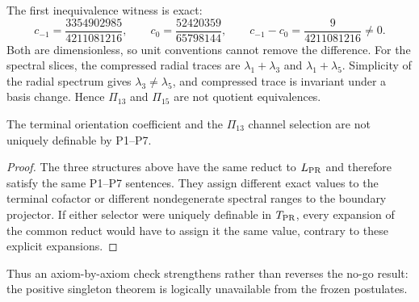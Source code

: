 The first inequivalence witness is exact:
\begin{equation}
 c_{-1}=\frac{3354902985}{4211081216},\qquad
 c_0=\frac{52420359}{65798144},\qquad
 c_{-1}-c_0=\frac{9}{4211081216}\ne0.
\end{equation}
Both are dimensionless, so unit conventions cannot remove the difference.
For the spectral slices, the compressed radial traces are
$\lambda_1+\lambda_3$ and $\lambda_1+\lambda_5$.  Simplicity of the radial
spectrum gives $\lambda_3\ne\lambda_5$, and compressed trace is invariant
under a basis change.  Hence $\Pi_{13}$ and $\Pi_{15}$ are not quotient
equivalences.

\begin{theorem}
The terminal orientation coefficient and the $\Pi_{13}$ channel selection are
not uniquely definable by P1--P7.
\end{theorem}
\begin{proof}
The three structures above have the same reduct to $L_{\rm PR}$ and therefore
satisfy the same P1--P7 sentences.  They assign different exact values to the
terminal cofactor or different nondegenerate spectral ranges to the boundary
projector.  If either selector were uniquely definable in $T_{\rm PR}$, every
expansion of the common reduct would have to assign it the same value, contrary
to these explicit expansions.
\end{proof}

Thus an axiom-by-axiom check strengthens rather than reverses the no-go result:
the positive singleton theorem is logically unavailable from the frozen
postulates.
